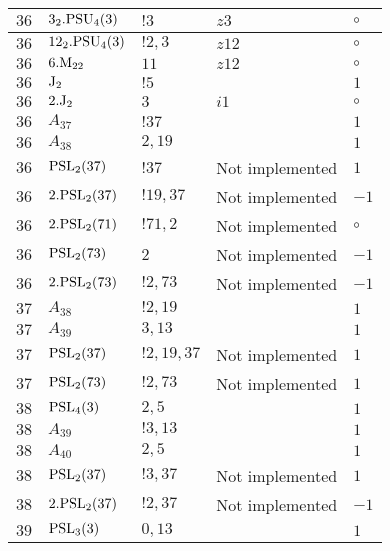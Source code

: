 \documentclass[a4paper, 11pt]{article}
\begin{document}
\begin{longtable}{lllll}
        $ 36 $ & $ 3_2.{\rm PSU}_{4}(3) $ & $ ! 3 $ & $ z3 $ &  $\circ$ \\ \hline
        $ 36 $ & $ 12_2.{\rm PSU}_{4}(3) $ & $ ! 2,3 $ & $ z12 $ &  $\circ$ \\ \hline
        $ 36 $ & $ 6.{\rm M}_{22} $ & $ 11 $ & $ z12 $ &  $\circ$ \\ \hline
        $ 36 $ & $ {\rm J}_2 $ & $ ! 5 $ & $ ~ $ & $ 1$ \\ \hline
        $ 36 $ & $ 2.{\rm J}_2 $ & $ 3 $ & $ i1 $ &  $\circ$ \\ \hline
        $ 36 $ & $ A_{37} $ & $ !37 $ & $ ~ $ & $ 1$ \\ \hline
        $ 36 $ & $ A_{38} $ & $ 2, 19 $ & $ ~ $ & $ 1$ \\ \hline
        $ 36 $ & $ {\rm PSL}_{2}(37) $ & $ !37 $ &  Not implemented & $ 1$ \\ \hline
        $ 36 $ & $ 2.{\rm PSL}_{2}(37) $ & $ !19, 37 $ &  Not implemented & $ -1$ \\ \hline
        $ 36 $ & $ 2.{\rm PSL}_{2}(71) $ & $ !71, 2 $ &  Not implemented &  $\circ$ \\ \hline
        $ 36 $ & $ {\rm PSL}_{2}(73) $ & $ 2 $ &  Not implemented & $ -1$ \\ \hline
        $ 36 $ & $ 2.{\rm PSL}_{2}(73) $ & $ !2, 73 $ &  Not implemented & $ -1$ \\ \hline
        $ 37 $ & $ A_{38} $ & $ !2, 19 $ & $ ~ $ & $ 1$ \\ \hline
        $ 37 $ & $ A_{39} $ & $ 3, 13 $ & $ ~ $ & $ 1$ \\ \hline
        $ 37 $ & $ {\rm PSL}_{2}(37) $ & $ !2, 19, 37 $ &  Not implemented & $ 1$ \\ \hline
        $ 37 $ & $ {\rm PSL}_{2}(73) $ & $ !2, 73 $ &  Not implemented & $ 1$ \\ \hline
        $ 38 $ & $ {\rm PSL}_{4}(3) $ & $ 2,5 $ & $ ~ $ & $ 1$ \\ \hline
        $ 38 $ & $ A_{39} $ & $ !3, 13 $ & $ ~ $ & $ 1$ \\ \hline
        $ 38 $ & $ A_{40} $ & $ 2, 5 $ & $ ~ $ & $ 1$ \\ \hline
        $ 38 $ & $ {\rm PSL}_{2}(37) $ & $ !3, 37 $ &  Not implemented & $ 1$ \\ \hline
        $ 38 $ & $ 2.{\rm PSL}_{2}(37) $ & $ !2, 37 $ &  Not implemented & $ -1$ \\ \hline
        $ 39 $ & $ {\rm PSL}_{3}(3) $ & $ 0,13 $ & $ ~ $ & $ 1$ \\ \hline

\end{longtable}
\end{document}
